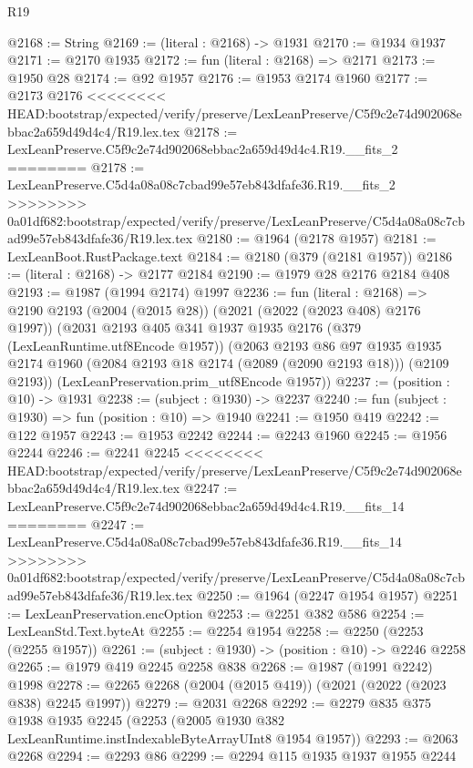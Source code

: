 \begin{lexlean}{R19}
\begin{coremodule}
{{{{{{{{{{{{{{{{{{{{{{{{{{{{{{{{{{{{{{{{{{{{{{{{{{{{{{{{{{{{{{{{{{{{{{{{{{{{{{{{{{{{{{{@2168 := String
@2169 := (literal : @2168) -> @1931
@2170 := @1934 @1937
@2171 := @2170 @1935
@2172 := fun (literal : @2168) => @2171
@2173 := @1950 @28
@2174 := @92 @1957
@2176 := @1953 @2174 @1960
@2177 := @2173 @2176
<<<<<<<< HEAD:bootstrap/expected/verify/preserve/LexLeanPreserve/C5f9c2e74d902068ebbac2a659d49d4c4/R19.lex.tex
@2178 := LexLeanPreserve.C5f9c2e74d902068ebbac2a659d49d4c4.R19.__fits_2
========
@2178 := LexLeanPreserve.C5d4a08a08c7cbad99e57eb843dfafe36.R19.__fits_2
>>>>>>>> 0a01df682:bootstrap/expected/verify/preserve/LexLeanPreserve/C5d4a08a08c7cbad99e57eb843dfafe36/R19.lex.tex
@2180 := @1964 (@2178 @1957)
@2181 := LexLeanBoot.RustPackage.text
@2184 := @2180 (@379 (@2181 @1957))
@2186 := (literal : @2168) -> @2177 @2184
@2190 := @1979 @28 @2176 @2184 @408
@2193 := @1987 (@1994 @2174) @1997
@2236 := fun (literal : @2168) =>
  @2190
    @2193
    (@2004 (@2015 @28))
    (@2021 (@2022 (@2023 @408) @2176 @1997))
    (@2031
      @2193
      @405
      @341
      @1937
      @1935
      @2176
      (@379 (LexLeanRuntime.utf8Encode @1957))
      (@2063
        @2193
        @86
        @97
        @1935
        @1935
        @2174
        @1960
        (@2084 @2193 @18 @2174 (@2089 (@2090 @2193 @18)))
        (@2109 @2193))
      (LexLeanPreservation.prim_utf8Encode @1957))
@2237 := (position : @10) -> @1931
@2238 := (subject : @1930) -> @2237
@2240 := fun (subject : @1930) => fun (position : @10) => @1940
@2241 := @1950 @419
@2242 := @122 @1957
@2243 := @1953 @2242
@2244 := @2243 @1960
@2245 := @1956 @2244
@2246 := @2241 @2245
<<<<<<<< HEAD:bootstrap/expected/verify/preserve/LexLeanPreserve/C5f9c2e74d902068ebbac2a659d49d4c4/R19.lex.tex
@2247 := LexLeanPreserve.C5f9c2e74d902068ebbac2a659d49d4c4.R19.__fits_14
========
@2247 := LexLeanPreserve.C5d4a08a08c7cbad99e57eb843dfafe36.R19.__fits_14
>>>>>>>> 0a01df682:bootstrap/expected/verify/preserve/LexLeanPreserve/C5d4a08a08c7cbad99e57eb843dfafe36/R19.lex.tex
@2250 := @1964 (@2247 @1954 @1957)
@2251 := LexLeanPreservation.encOption
@2253 := @2251 @382 @586
@2254 := LexLeanStd.Text.byteAt
@2255 := @2254 @1954
@2258 := @2250 (@2253 (@2255 @1957))
@2261 := (subject : @1930) -> (position : @10) -> @2246 @2258
@2265 := @1979 @419 @2245 @2258 @838
@2268 := @1987 (@1991 @2242) @1998
@2278 := @2265 @2268 (@2004 (@2015 @419)) (@2021 (@2022 (@2023 @838) @2245 @1997))
@2279 := @2031 @2268
@2292 := @2279
    @835
    @375
    @1938
    @1935
    @2245
    (@2253 (@2005 @1930 @382 LexLeanRuntime.instIndexableByteArrayUInt8 @1954 @1957))
@2293 := @2063 @2268
@2294 := @2293 @86
@2299 := @2294 @115 @1935 @1937 @1955 @2244
}}}}}}}}}}}}}}}}}}}}}}}}}}}}}}}}}}}}}}}}}}}}}}}}}}}}}}}}}}}}}}}}}}}}}}}}}}}}}}}}}}}}}}}
\end{coremodule}
\end{lexlean}
